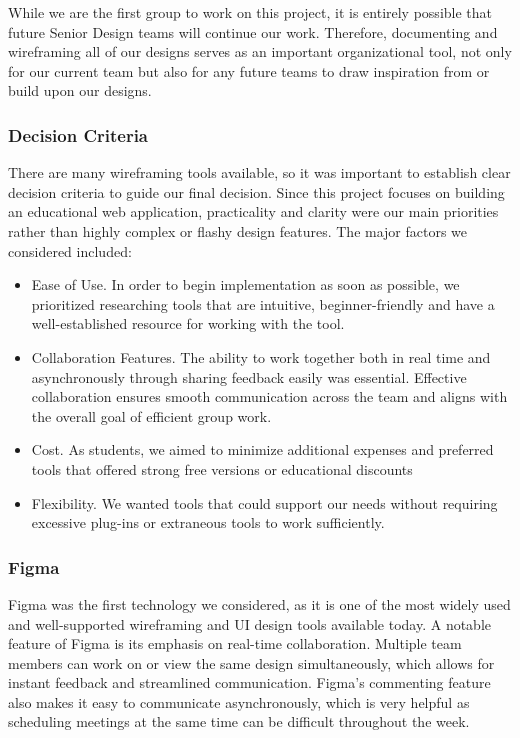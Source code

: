 \documentclass[12pt,titlepage]{article}
\begin{document}
While we are the first group to work on this project, it is entirely possible that future Senior Design teams will continue our work. Therefore, documenting and wireframing all of our designs serves as an important organizational tool, not only for our current team but also for any future teams to draw inspiration from or build upon our designs.

\subsubsection{Decision Criteria}
There are many wireframing tools available, so it was important to establish clear decision criteria to guide our final decision. Since this project focuses on building an educational web application, practicality and clarity were our main priorities rather than highly complex or flashy design features. The major factors we considered included:
\begin{itemize}
	\item Ease of Use. In order to begin implementation as soon as possible, we prioritized researching tools that are intuitive, beginner-friendly and have a well-established resource for working with the tool.
	\item Collaboration Features. The ability to work together both in real time and asynchronously through sharing feedback easily was essential. Effective collaboration ensures smooth communication across the team and aligns with the overall goal of efficient group work.
	\item Cost. As students, we aimed to minimize additional expenses and preferred tools that offered strong free versions or educational discounts
	\item Flexibility. We wanted tools that could support our needs without requiring excessive plug-ins or extraneous tools to work sufficiently.
\end{itemize}

\subsubsection{Figma}
Figma was the first technology we considered, as it is one of the most widely used and well-supported wireframing and UI design tools available today. A notable feature of Figma is its emphasis on real-time collaboration. Multiple team members can work on or view the same design simultaneously, which allows for instant feedback and streamlined communication. Figma’s commenting feature also makes it easy to communicate asynchronously, which is very helpful as scheduling meetings at the same time can be difficult throughout the week.
\end{document}
